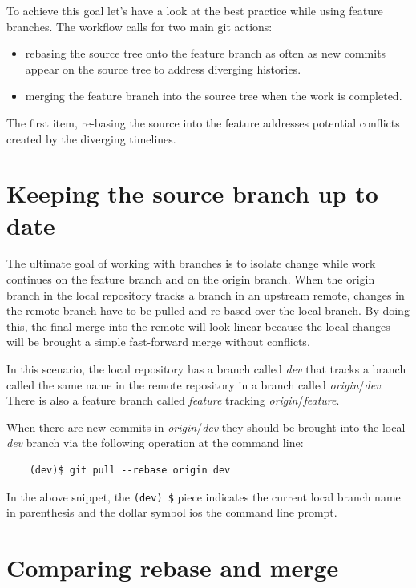 \documentclass[10pt]{article}
\begin{document}
To achieve this goal let's have a look at the best practice while using feature branches.
The workflow calls for two main git actions:

\begin{itemize}
    \item rebasing the source tree onto the feature branch as often as new commits appear on the source tree to address diverging histories.
    \item merging the feature branch into the source tree when the work is completed.
\end{itemize}

The first item, re-basing the source into the feature addresses potential conflicts created by the diverging timelines.

\section{Keeping the source branch up to date}

The ultimate goal of working with branches is to isolate change while work continues on the feature branch and on the origin branch.
When the origin branch in the local repository tracks a branch in an upstream remote, changes in the remote branch have to be pulled and re-based over the local branch.
By doing this, the final merge into the remote will look linear because the local changes will be brought a simple fast-forward merge without conflicts.

In this scenario, the local repository has a branch called \textit{dev} that tracks a branch called the same name in the remote repository in a branch called \textit{origin}/\textit{dev}.
There is also a feature branch called \textit{feature} tracking \textit{origin}/\textit{feature}.

When there are new commits in \textit{origin}/\textit{dev} they should be brought into the local \textit{dev} branch via the following operation at the command line:

\begin{verbatim}
    (dev)$ git pull --rebase origin dev 
\end{verbatim}


In the above snippet, the \verb|(dev) $| piece indicates the current local branch name in parenthesis and the dollar symbol ios the command line prompt.


\section{Comparing rebase and merge}
\label{sec:rebaseVsmeerge}
\end{document}
